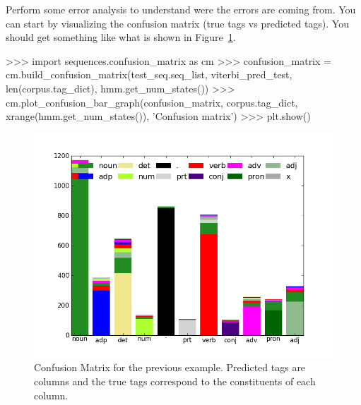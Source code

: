 \begin{exercise}
Perform some error analysis to understand were the errors are coming
from. You can start by visualizing the confusion matrix (true tags vs
predicted tags). You should get something like what is shown in Figure~\ref{fig:cm_uns}.

\begin{python}
>>> import sequences.confusion_matrix as cm
>>> confusion_matrix = cm.build_confusion_matrix(test_seq.seq_list, viterbi_pred_test, len(corpus.tag_dict), hmm.get_num_states())
>>> cm.plot_confusion_bar_graph(confusion_matrix, corpus.tag_dict, xrange(hmm.get_num_states()), 'Confusion matrix')
>>> plt.show()
\end{python}

\begin{figure}
\centering
\includegraphics[scale=.5]{figs/sequences/cm_sup.png}
\caption{\label{fig:cm_uns} Confusion Matrix for the previous
  example. Predicted tags are columns and the true tags correspond to
  the constituents of each column.}
\end{figure}

\end{exercise}


%
%




